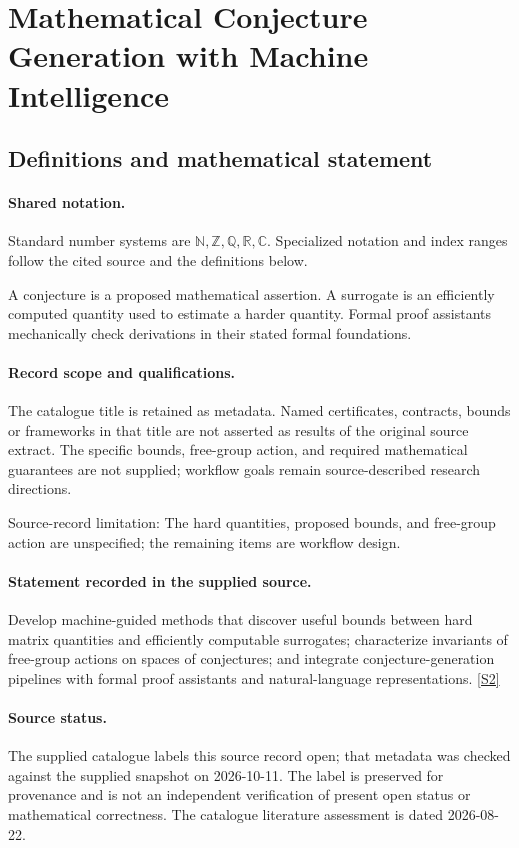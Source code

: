 \documentclass[11pt]{article}
\newcommand{\sref}[2]{\hyperlink{source:#1:#2}{[S#2]}}
\begin{document}
\section{Mathematical Conjecture Generation with Machine Intelligence}\label{statement}

\subsection{Definitions and mathematical statement}

\paragraph{Shared notation.}Standard number systems are $\mathbb N,\mathbb Z,\mathbb Q,\mathbb R,\mathbb C$. Specialized notation and index ranges follow the cited source and the definitions below.


A conjecture is a proposed mathematical assertion. A surrogate is an efficiently computed quantity used to estimate a harder quantity. Formal proof assistants mechanically check derivations in their stated formal foundations.
\paragraph{Record scope and qualifications.}
The catalogue title is retained as metadata. Named certificates, contracts, bounds or frameworks in that title are not asserted as results of the original source extract.
The specific bounds, free-group action, and required mathematical guarantees are not supplied; workflow goals remain source-described research directions.

Source-record limitation: The hard quantities, proposed bounds, and free-group action are unspecified; the remaining items are workflow design.
\paragraph{Statement recorded in the supplied source.}
Develop machine-guided methods that discover useful bounds between hard matrix quantities and efficiently computable surrogates; characterize invariants of free-group actions on spaces of conjectures; and integrate conjecture-generation pipelines with formal proof assistants and natural-language representations. \sref{statement}{2}
\paragraph{Source status.}
The supplied catalogue labels this source record open; that metadata was checked against the supplied snapshot on 2026-10-11. The label is preserved for provenance and is not an independent verification of present open status or mathematical correctness. The catalogue literature assessment is dated 2026-08-22.
\end{document}
